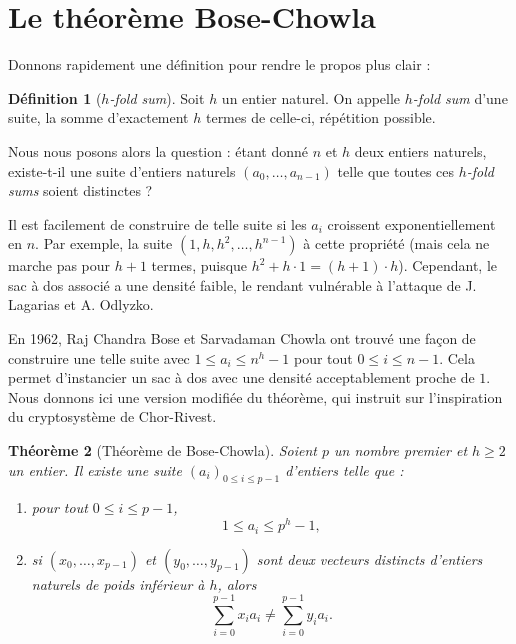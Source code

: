 \documentclass[a4paper, titlepage]{article}
\newtheorem{theo}{Théorème}[section]
\theoremstyle{definition}
\newtheorem{defi}[theo]{Définition}
\theoremstyle{remark}
\begin{document}
\section{Le théorème Bose-Chowla}

Donnons rapidement une définition pour rendre le propos plus clair :

\begin{defi}[\textit{$h$-fold sum}]
Soit $h$ un entier naturel. On appelle \textit{$h$-fold sum} d'une suite, la somme d'exactement $h$ termes de celle-ci, répétition possible.
\end{defi}

Nous nous posons alors la question : étant donné $n$ et $h$ deux entiers naturels, existe-t-il une suite d'entiers naturels $(a_0, \dots, a_{n-1})$ telle que toutes ces \textit{$h$-fold sums} soient distinctes ?

Il est facilement de construire de telle suite si les $a_i$ croissent exponentiellement en $n$. Par exemple, la suite $(1, h, h^2, \dots, h^{n-1})$ à cette propriété (mais cela ne marche pas pour $h+1$ termes, puisque $h^2 + h\cdot1 = (h+1) \cdot h$). Cependant, le sac à dos associé a une  densité faible, le rendant vulnérable à l'attaque de J. Lagarias et A. Odlyzko.

En 1962, Raj Chandra Bose et Sarvadaman Chowla ont trouvé une façon de construire une telle suite avec $1 \leqslant a_i \leqslant n^h-1$ pour tout ${0 \leqslant i \leqslant n-1}$. Cela permet d'instancier un sac à dos avec une densité acceptablement proche de $1$. Nous donnons ici une version modifiée du théorème, qui instruit sur l'inspiration du cryptosystème de Chor-Rivest.

\begin{theo}[Théorème de Bose-Chowla]
Soient $p$ un nombre premier et $h \geqslant 2$ un entier. Il existe une suite ${(a_i)}_{0\leqslant i \leqslant p-1}$ d'entiers telle que : \begin{enumerate}
\item pour tout $0 \leqslant i \leqslant p-1$, $$1 \leqslant a_i \leqslant p^h-1,$$
\item si $(x_0, \dots, x_{p-1})$ et $(y_0, \dots, y_{p-1})$ sont deux vecteurs distincts d'entiers naturels de poids inférieur à $h$, alors 
$$\sum_{i=0}^{p-1} x_ia_i \neq \sum_{i=0}^{p-1} y_ia_i.$$
\end{enumerate}
\end{theo}
\end{document}
